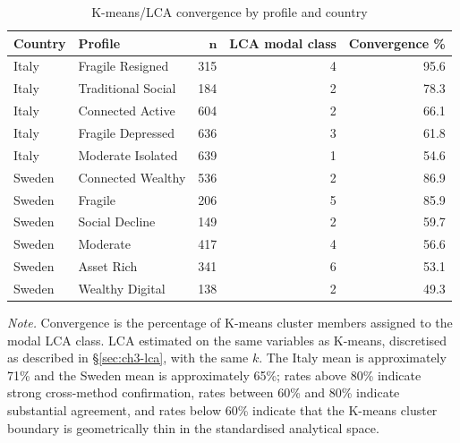 \begin{table}[!htbp]
  \centering
  \small
  \caption[K-means/LCA convergence by profile and country]{K-means/LCA convergence by profile and country}
  \label{tab:ch7-lca-convergence}
  \renewcommand{\arraystretch}{1.2}
  \setlength{\tabcolsep}{8pt}
  \begin{tabular}{@{}llrrr@{}}
    \toprule
    \textbf{Country} & \textbf{Profile} & $\boldsymbol{n}$ & \textbf{LCA modal class} & \textbf{Convergence \%} \\
    \midrule
    Italy & Fragile Resigned & 315 & 4 & 95.6 \\
    Italy & Traditional Social & 184 & 2 & 78.3 \\
    Italy & Connected Active & 604 & 2 & 66.1 \\
    Italy & Fragile Depressed & 636 & 3 & 61.8 \\
    Italy & Moderate Isolated & 639 & 1 & 54.6 \\
    \midrule
    Sweden & Connected Wealthy & 536 & 2 & 86.9 \\
    Sweden & Fragile & 206 & 5 & 85.9 \\
    Sweden & Social Decline & 149 & 2 & 59.7 \\
    Sweden & Moderate & 417 & 4 & 56.6 \\
    Sweden & Asset Rich & 341 & 6 & 53.1 \\
    Sweden & Wealthy Digital & 138 & 2 & 49.3 \\
    \bottomrule
  \end{tabular}
  \par\medskip
  \begin{minipage}{\linewidth}
    \footnotesize\textit{Note.} Convergence is the percentage of K-means cluster members assigned to the modal LCA class. LCA estimated on the same variables as K-means, discretised as described in \S\ref{sec:ch3-lca}, with the same $k$. The Italy mean is approximately 71\% and the Sweden mean is approximately 65\%; rates above 80\% indicate strong cross-method confirmation, rates between 60\% and 80\% indicate substantial agreement, and rates below 60\% indicate that the K-means cluster boundary is geometrically thin in the standardised analytical space.
  \end{minipage}
\end{table}
\FloatBarrier

